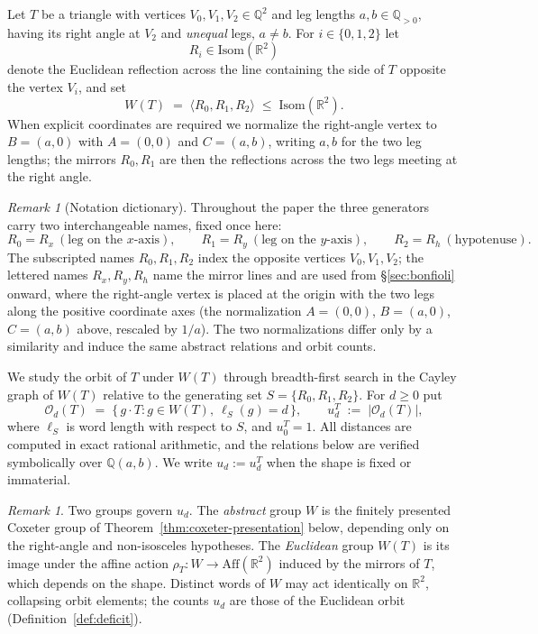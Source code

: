 \documentclass[11pt]{article}
\theoremstyle{plain}
\theoremstyle{definition}
\theoremstyle{remark}
\newtheorem{remark}[theorem]{Remark}
\begin{document}
Let $T$ be a triangle with vertices $V_0, V_1, V_2 \in \mathbb{Q}^2$ and leg lengths $a, b \in \mathbb{Q}_{>0}$, having its right angle at $V_2$ and \emph{unequal} legs, $a \neq b$. For $i \in \{0,1,2\}$ let
\[
  R_i \in \mathrm{Isom}(\mathbb{R}^2)
\]
denote the Euclidean reflection across the line containing the side of $T$ opposite the vertex $V_i$, and set
\[
  W(T) \;=\; \langle R_0, R_1, R_2 \rangle \;\le\; \mathrm{Isom}(\mathbb{R}^2).
\]
When explicit coordinates are required we normalize the right-angle vertex to $B = (a,0)$ with $A = (0,0)$ and $C = (a,b)$, writing $a,b$ for the two leg lengths; the mirrors $R_0, R_1$ are then the reflections across the two legs meeting at the right angle.

\begin{remark}[Notation dictionary]
\label{rem:notation-dictionary}
Throughout the paper the three generators carry two interchangeable names, fixed once here:
\[
  R_0 = R_x \ (\text{leg on the } x\text{-axis}), \qquad
  R_1 = R_y \ (\text{leg on the } y\text{-axis}), \qquad
  R_2 = R_h \ (\text{hypotenuse}).
\]
The subscripted names $R_0, R_1, R_2$ index the opposite vertices $V_0, V_1, V_2$; the lettered names $R_x, R_y, R_h$ name the mirror lines and are used from \S\ref{sec:bonfioli} onward, where the right-angle vertex is placed at the origin with the two legs along the positive coordinate axes (the normalization $A=(0,0)$, $B=(a,0)$, $C=(a,b)$ above, rescaled by $1/a$). The two normalizations differ only by a similarity and induce the same abstract relations and orbit counts.
\end{remark}

We study the orbit of $T$ under $W(T)$ through breadth-first search in the Cayley graph of $W(T)$ relative to the generating set $S = \{R_0, R_1, R_2\}$. For $d \ge 0$ put
\[
  \mathcal{O}_d(T) \;=\; \bigl\{\, g \cdot T : g \in W(T),\ \ell_S(g) = d \,\bigr\},
  \qquad
  u_d^T \;:=\; \bigl| \mathcal{O}_d(T) \bigr|,
\]
where $\ell_S$ is word length with respect to $S$, and $u_0^T = 1$. All distances are computed in exact rational arithmetic, and the relations below are verified symbolically over $\mathbb{Q}(a,b)$. We write $u_d := u_d^T$ when the shape is fixed or immaterial.

\begin{remark}
\label{rem:two-layers}
Two groups govern $u_d$. The \emph{abstract} group $W$ is the finitely presented Coxeter group of Theorem~\ref{thm:coxeter-presentation} below, depending only on the right-angle and non-isosceles hypotheses. The \emph{Euclidean} group $W(T)$ is its image under the affine action $\rho_T \colon W \to \mathrm{Aff}(\mathbb{R}^2)$ induced by the mirrors of $T$, which depends on the shape. Distinct words of $W$ may act identically on $\mathbb{R}^2$, collapsing orbit elements; the counts $u_d$ are those of the Euclidean orbit (Definition~\ref{def:deficit}).
\end{remark}
\end{document}

